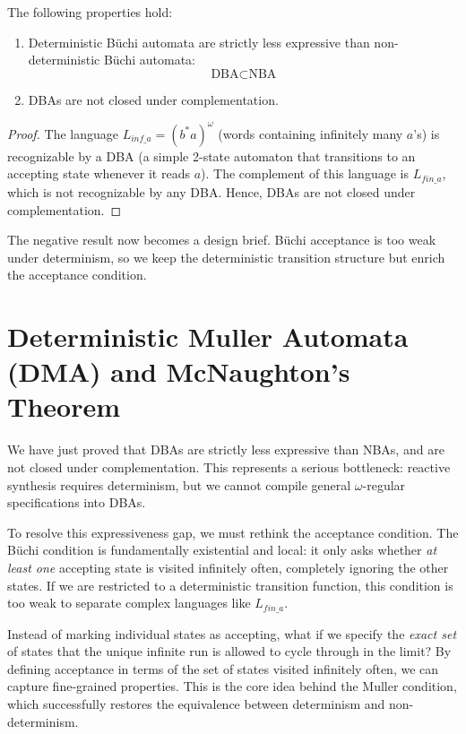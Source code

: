 \begin{corollary}
The following properties hold:
\begin{enumerate}
    \item Deterministic Büchi automata are strictly less expressive than non-deterministic Büchi automata:
    $$\text{DBA} \subset \text{NBA}$$
    \item DBAs are not closed under complementation.
\end{enumerate}
\end{corollary}

\begin{proof}
The language $L_{inf\_a} = (b^*a)^\omega$ (words containing infinitely many $a$'s) is recognizable by a DBA (a simple 2-state automaton that transitions to an accepting state whenever it reads $a$). The complement of this language is $L_{fin\_a}$, which is not recognizable by any DBA. Hence, DBAs are not closed under complementation.
\end{proof}

The negative result now becomes a design brief. Büchi acceptance is too weak under determinism, so we keep the deterministic transition structure but enrich the acceptance condition.

\section{Deterministic Muller Automata (DMA) and McNaughton's Theorem}
\label{sec:dma-mcnaughton}

We have just proved that DBAs are strictly less expressive than NBAs, and are not closed under complementation. This represents a serious bottleneck: reactive synthesis requires determinism, but we cannot compile general $\omega$-regular specifications into DBAs.

To resolve this expressiveness gap, we must rethink the acceptance condition. The Büchi condition is fundamentally existential and local: it only asks whether \emph{at least one} accepting state is visited infinitely often, completely ignoring the other states. If we are restricted to a deterministic transition function, this condition is too weak to separate complex languages like $L_{fin\_a}$.

Instead of marking individual states as accepting, what if we specify the \emph{exact set} of states that the unique infinite run is allowed to cycle through in the limit? By defining acceptance in terms of the set of states visited infinitely often, we can capture fine-grained properties. This is the core idea behind the Muller condition, which successfully restores the equivalence between determinism and non-determinism.

